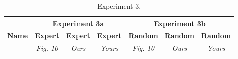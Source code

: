\begin{table}

\experimentTableSize

\begin{tabular}{l|cccccc}
& \multicolumn{3}{c}{\textbf{Experiment 3a}}
& \multicolumn{3}{c}{\textbf{Experiment 3b}} \\\hline
\textbf{Name} &
\textbf{Expert} & \textbf{Expert} & \textbf{Expert} &
\textbf{Random} & \textbf{Random} & \textbf{Random} \\
&
\textit{Fig. 10} & \textit{Ours} & \textit{Yours} &
\textit{Fig. 10} & \textit{Ours} & \textit{Yours} \\

\end{tabular}

\vspace{0.10in}

\caption{Experiment 3.}

\end{table}

